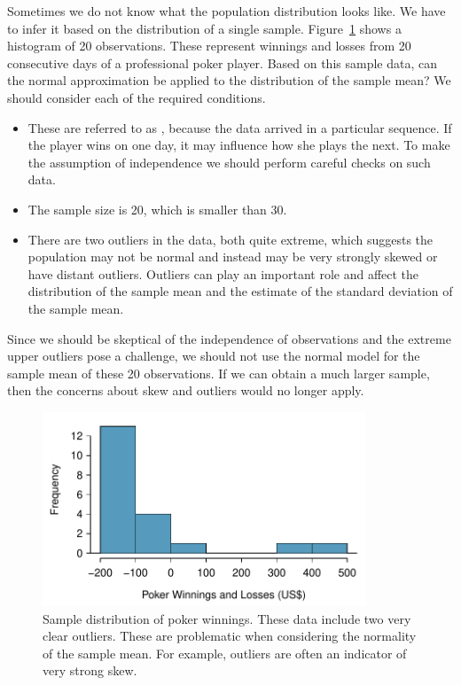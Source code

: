 \begin{example}{Sometimes we do not know what the population distribution looks like. We have to infer it based on the distribution of a single sample. Figure~\ref{pokerProfitsCanApplyNormalToSampMean} shows a histogram of 20 observations. These represent winnings and losses from 20 consecutive days of a professional poker player. Based on this sample data, can the normal approximation be applied to the distribution of the sample mean?}
We should consider each of the required conditions.
\begin{itemize}
\setlength{\itemsep}{0mm}
\item[(1)] These are referred to as , because the data arrived in a particular sequence. If the player wins on one day, it may influence how she plays the next. To make the assumption of independence we should perform careful checks on such data.
\item[(2)] The sample size is 20, which is smaller than 30.
\item[(3)] There are two outliers in the data, both quite extreme, which suggests the population may not be normal and instead may be very strongly skewed or have distant outliers. Outliers can play an important role and affect the distribution of the sample mean and the estimate of the standard deviation of the sample mean.
\end{itemize}
Since we should be skeptical of the independence of observations and the extreme upper outliers pose a challenge, we should not use the normal model for the sample mean of these 20 observations. If we can obtain a much larger sample, then the concerns about skew and outliers would no longer apply.
\end{example}

\begin{figure}[ht]
   \centering
   \includegraphics[height=58mm]{ch_distributions/figures/pokerProfitsCanApplyNormalToSampMean/pokerProfitsCanApplyNormalToSampMean}
   \caption{Sample distribution of poker winnings. These data include two very clear outliers. These are problematic when considering the normality of the sample mean. For example, outliers are often an indicator of very strong skew.}
   \label{pokerProfitsCanApplyNormalToSampMean}
\end{figure}

